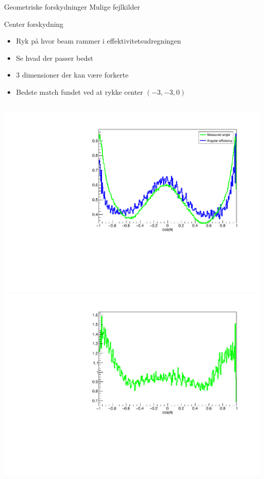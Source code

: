 \begin{frame}{Geometriske forskydninger}
	Mulige fejlkilder
	\begin{itemize}
	\end{itemize}
\end{frame}

\begin{frame}{Center forskydning}
	\begin{itemize}
		\item Ryk på hvor beam rammer i effektivitetsudregningen
		\item Se hvad der passer bedst
		\item 3 dimensioner der kan være forkerte
		\item Bedste match fundet ved at rykke center $(-3, -3, 0)$
	\end{itemize}
\begin{columns}
	\includegraphics[width=\columnwidth]{../figures/betaAngles/centerCorrectedAndData.pdf}
	\includegraphics[width=\columnwidth]{../figures/betaAngles/dataDivEffCenterCorrected.pdf}

\end{columns}
\end{frame}
